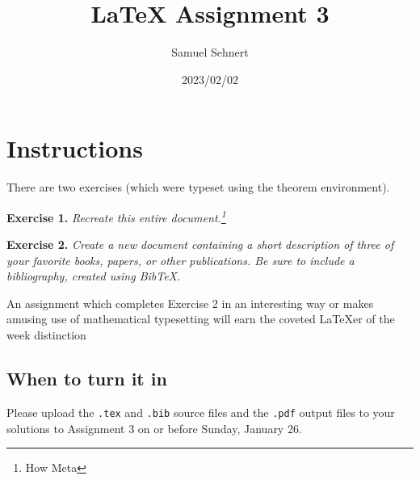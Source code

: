 \documentclass[10pt]{article}
\title{\LaTeX{} Assignment 3}
\author{Samuel Sehnert}
\date{2023/02/02}
\begin{document}
    \maketitle
    \tableofcontents
    \section{Instructions}
        There are two exercises (which were typeset using the theorem environment).

        \textbf{Exercise 1.} \textit{Recreate this entire document.\footnote{How Meta}}

        \textbf{Exercise 2.} \textit{Create a new document containing a short description of three
            of your favorite books, papers, or other publications. Be sure to include a
            bibliography, created using BibTeX.}

        \setlength{\parindent}{2eM}
        An assignment which completes Exercise 2 in an interesting way or makes
        amusing use of mathematical typesetting will earn the coveted \LaTeX{}er of the
        week distinction
    \subsection[Due Date]{When to turn it in}
        Please upload the \verb|.tex| and \verb|.bib| source files and the \verb|.pdf| output files to your
        solutions to Assignment 3 on or before Sunday, January 26.
\end{document}
